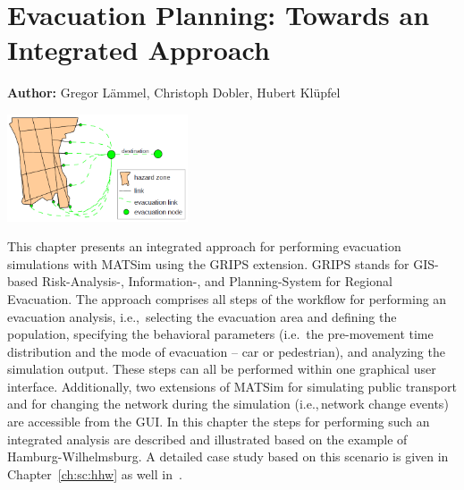\chapter{Evacuation Planning: Towards an Integrated Approach}
\label{ch:evacuation}

\hfill \textbf{Author:} Gregor Lämmel, Christoph Dobler, Hubert Klüpfel 

\begin{center} \includegraphics[width=0.4\textwidth, angle=0]{extending/figures/Evacuation/evacuation} \end{center}


This chapter presents an integrated approach for performing evacuation simulations with MATSim using the GRIPS extension. GRIPS stands for  GIS-based Risk-Analysis-, Information-, and Planning-System for Regional Evacuation. 
The approach comprises all steps of the workflow for performing an evacuation analysis, i.e.,\, 
selecting the evacuation area and defining the population, specifying the behavioral parameters 
(i.e.\ the pre-movement time distribution and the mode of evacuation -- car or pedestrian), 
and analyzing the simulation output.
These steps can all be performed within one graphical user interface.
Additionally, two extensions of MATSim for simulating public transport and for changing the network 
during the simulation (i.e.,\,network change events) are accessible from the GUI.
In this chapter the steps for performing such an integrated analysis are described and illustrated based on
the example of Hamburg-Wilhelmsburg. A detailed case study based on this scenario is given in Chapter~\ref{ch:sc:hhw} as well in~\cite{DurstAtAl2012PEDGRIPSAppl,Hugenbusch2012Bachelor}.


